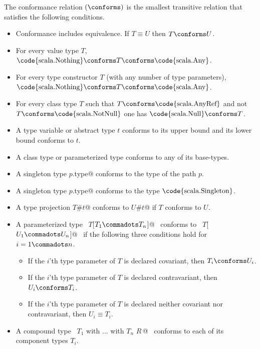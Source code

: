 The conformance relation $(\conforms)$ is the smallest 
transitive relation that satisfies the following conditions.
\begin{itemize}
\item Conformance includes equivalence. If $T \equiv U$ then $T \conforms U$.
\item For every value type $T$, 
      $\mbox{\code{scala.Nothing}} \conforms T \conforms \mbox{\code{scala.Any}}$. 
\item For every type constructor $T$ (with any number of type parameters), 
      $\mbox{\code{scala.Nothing}} \conforms T \conforms \mbox{\code{scala.Any}}$. %
      
\item For every class type $T$ such that $T \conforms
  \mbox{\code{scala.AnyRef}}$ and not $T \conforms \mbox{\code{scala.NotNull}}$
        one has $\mbox{\code{scala.Null}} \conforms T$.
\item A type variable or abstract type $t$ conforms to its upper bound and
      its lower bound conforms to $t$. 
\item A class type or parameterized type conforms to any of its
  base-types.
\item A singleton type \lstinline@$p$.type@ conforms to the type of
  the path $p$.
\item A singleton type \lstinline@$p$.type@ conforms to the type $\mbox{\code{scala.Singleton}}$.
\item A type projection \lstinline@$T$#$t$@ conforms to \lstinline@$U$#$t$@ if 
      $T$ conforms to $U$.
\item A parameterized type ~\lstinline@$T$[$T_1 \commadots T_n$]@~ conforms to 
      ~\lstinline@$T$[$U_1 \commadots U_n$]@~ if
      the following three conditions hold for $i = 1 \commadots n$. 
      \begin{itemize}
      \item
      If the $i$'th type parameter of $T$ is declared covariant, then $T_i \conforms U_i$.
      \item
      If the $i$'th type parameter of $T$ is declared contravariant, then $U_i \conforms T_i$.
      \item
      If the $i$'th type parameter of $T$ is declared neither covariant 
      nor contravariant, then $U_i \equiv T_i$.
      \end{itemize}
\item A compound type ~\lstinline@$T_1$ with $\ldots$ with $T_n$ {$R\,$}@~ conforms to
      each of its component types $T_i$.

\end{itemize}
